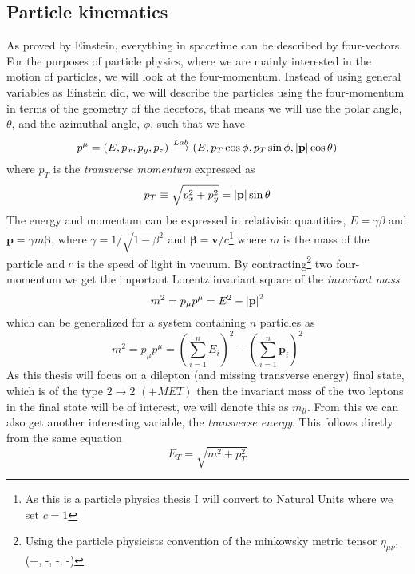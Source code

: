 \documentclass[14pt, a4paper]{book}
\begin{document}
\subsection{Particle kinematics}\label{sec:particle_kinematics}
As proved by Einstein, everything in spacetime can be described by four-vectors. For the purposes of particle physics, where we are mainly interested in the motion of particles, 
we will look at the four-momentum. Instead of using general variables as Einstein did, we will describe the particles using the four-momentum in terms of the geometry of the decetors, that means we will use 
the polar angle, $\theta$, and the azimuthal angle, $\phi$, such that we have
\begin{equation}\label{eq:four-momentum}
    p^\mu = (E, p_x, p_y, p_z) \overset{Lab}{\longrightarrow} (E, p_T\cos\phi, p_T\sin\phi, \abs{\mathbf{p}}\cos\theta)
\end{equation}
where $p_T$ is the \textit{transverse momentum} expressed as
\begin{equation}\label{eq:transverse_momentum}
    p_T \equiv\sqrt{p_x^2 +p_y^2} = \abs{\mathbf{p}}\sin\theta
\end{equation}
The energy and momentum can be expressed in relativisic quantities, $E=\gamma\beta$ and $\mathbf{p}=\gamma m\bm\beta$, where $\gamma = 1/\sqrt{1-\beta^2}$ and $\bm\beta = \mathbf{v}/c$\footnote{As this is a particle physics thesis I will convert to Natural Units where we set $c=1$} 
where $m$ is the mass of the particle 
and $c$ is the speed of light in vacuum. By contracting\footnote{Using the particle physicists convention of the minkowsky metric tensor $\eta_{\mu\nu}$,  (+, -, -, -)} two four-momentum we get the important Lorentz invariant 
square of the \textit{invariant mass}
$$
    m^2 = p_\mu p^\mu = E^2 - \abs{\mathbf{p}}^2 
$$
which can be generalized for a system containing $n$ particles as
\begin{equation}\label{eq:invariant_mass}
    m^2 = p_\mu p^\mu = \left(\sum_{i=1}^n E_i\right)^2 - \left(\sum_{i=1}^n\mathbf{p}_i\right)^2
\end{equation}
As this thesis will focus on a dilepton (and missing transverse energy) final state, which is of the type $2\rightarrow2$ $(+MET)$ then the invariant mass of the two leptons in the final state will be of interest, 
we will denote this as $m_{ll}$. From this we can also get another interesting variable, the \textit{transverse energy}. This follows diretly from the same equation
\begin{equation}\label{eq:transverse_energy}
    E_T = \sqrt{m^2 + p_T^2}
\end{equation}
\end{document}
